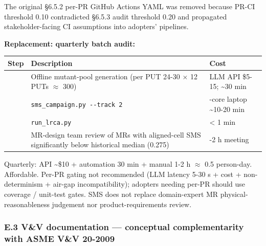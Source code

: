 \documentclass[review,12pt,authoryear]{elsarticle}
\newcounter{none}                   %
\begin{document}
The original §6.5.2 per-PR GitHub Actions YAML was removed because PR-CI
threshold 0.10 contradicted §6.5.3 audit threshold 0.20 and propagated
stakeholder-facing CI assumptions into adopters' pipelines.

\textbf{Replacement: quarterly batch audit:}

{\def\LTcaptype{none} %
\begin{longtable}[]{@{}
  >{\raggedright\arraybackslash}p{}
  >{\raggedright\arraybackslash}p{}
  >{\raggedright\arraybackslash}p{}@{}}
\toprule\noalign{}
\begin{minipage}[b]{\linewidth}\raggedright
Step
\end{minipage} & \begin{minipage}[b]{\linewidth}\raggedright
Description
\end{minipage} & \begin{minipage}[b]{\linewidth}\raggedright
Cost
\end{minipage} \\
\midrule\noalign{}
\endhead
\bottomrule\noalign{}
\endlastfoot
1 & Offline mutant-pool generation (per PUT 24-30 $\times$ 12 PUTs $\approx$ 300) & LLM
API \$5-15; \textasciitilde30 min \\
2 & \texttt{sms\_campaign.py\ -\/-track\ 2} & 4-core laptop
\textasciitilde10-20 min \\
3 & \texttt{run\_lrca.py} & \textless{} 1 min \\
4 & MR-design team review of MRs with aligned-cell SMS significantly
below historical median (0.275) & 1-2 h meeting \\
\end{longtable}
}

Quarterly: API \textasciitilde\$10 + automation 30 min + manual 1-2 h $\approx$
0.5 person-day. Affordable. Per-PR gating not recommended (LLM latency
5-30 s + cost + non-determinism + air-gap incompatibility); adopters
needing per-PR should use coverage / unit-test gates. SMS does not
replace domain-expert MR physical-reasonableness judgement nor
product-requirements review.

\subsubsection{E.3 V\&V documentation --- conceptual complementarity
with ASME V\&V
20-2009}\label{e.3-vv-documentation-conceptual-complementarity-with-asme-vv-20-2009}
\end{document}
